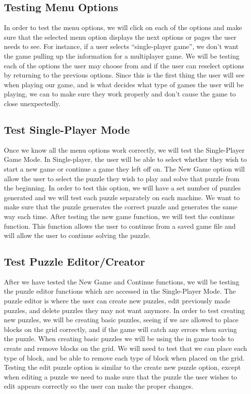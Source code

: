 \documentclass[12pt]{article}
\begin{document}
\subsection{Testing Menu Options}
In order to test the menu options, we will click on each of the options and make sure that the selected menu option displays the next options or pages the user needs to see. For instance, if a user selects “single-player game”, we don't want the game pulling up the information for a multiplayer game.
We will be testing each of the options the user may choose from and if the user can reselect options by returning to the previous options. Since this is the first thing the user will see when playing our game, and is what decides what type of games the user will be playing, we can to make sure they work properly and don't cause the game to close unexpectedly.

\subsection{Test Single-Player Mode}
Once we know all the menu options work correctly, we will test the Single-Player Game Mode. In Single-player, the user will be able to select whether they wish to start a new game or continue a game they left off on. The New Game option will allow the user to select the puzzle they wish to play and solve that puzzle from the beginning. In order to test this option, we will have a set number of puzzles generated and we will test each puzzle separately on each machine. We want to make sure that the puzzle generates the correct puzzle and generates the same way each time. After testing the new game function, we will test the continue function. This function allows the user to continue from a saved game file and will allow the user to continue solving the puzzle.

\subsection{Test Puzzle Editor/Creator}
After we have tested the New Game and Continue functions, we will be testing the puzzle editor functions which are accessed in the Single-Player Mode. The puzzle editor is where the user can create new puzzles, edit previously made puzzles, and delete puzzles they may not want anymore. In order to test creating new puzzles, we will be creating basic puzzles, seeing if we are allowed to place blocks on the grid correctly, and if the game will catch any errors when saving the puzzle. When creating basic puzzles we will be using the in game tools to create and remove blocks on the grid. We will need to test that we can place each type of block, and be able to remove each type of block when placed on the grid.
Testing the edit puzzle option is similar to the create new puzzle option, except when editing a puzzle we need to make sure that the puzzle the user wishes to edit appears correctly so the user can make the proper changes.
\end{document}
